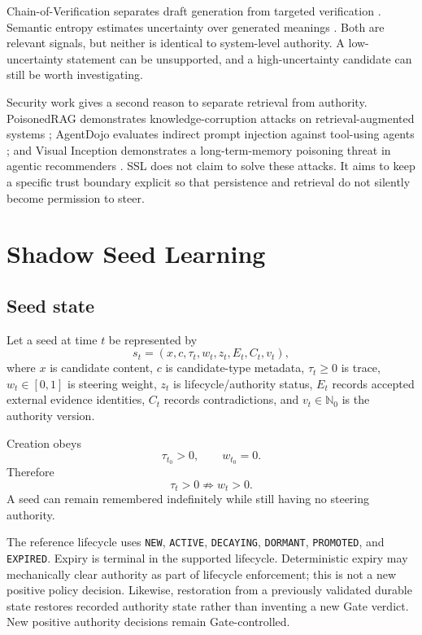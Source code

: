 \documentclass[11pt]{article}
\newcommand{\code}[1]{\texttt{#1}}
\begin{document}
Chain-of-Verification separates draft generation from targeted verification \citep{dhuliawala2024cove}. Semantic entropy estimates uncertainty over generated meanings \citep{farquhar2024semanticentropy}. Both are relevant signals, but neither is identical to system-level authority. A low-uncertainty statement can be unsupported, and a high-uncertainty candidate can still be worth investigating.

Security work gives a second reason to separate retrieval from authority. PoisonedRAG demonstrates knowledge-corruption attacks on retrieval-augmented systems \citep{zou2025poisonedrag}; AgentDojo evaluates indirect prompt injection against tool-using agents \citep{debenedetti2024agentdojo}; and Visual Inception demonstrates a long-term-memory poisoning threat in agentic recommenders \citep{qian2026visual}. SSL does not claim to solve these attacks. It aims to keep a specific trust boundary explicit so that persistence and retrieval do not silently become permission to steer.

\section{Shadow Seed Learning}
\label{sec:method}

\subsection{Seed state}

Let a seed at time $t$ be represented by
\begin{equation}
  s_t = (x,c,\tau_t,w_t,z_t,E_t,C_t,v_t),
\end{equation}
where $x$ is candidate content, $c$ is candidate-type metadata, $\tau_t \geq 0$ is trace, $w_t\in[0,1]$ is steering weight, $z_t$ is lifecycle/authority status, $E_t$ records accepted external evidence identities, $C_t$ records contradictions, and $v_t\in\mathbb{N}_0$ is the authority version.

Creation obeys
\begin{equation}
  \tau_{t_0}>0, \qquad w_{t_0}=0.
\end{equation}
Therefore
\begin{equation}
  \tau_t>0 \not\Rightarrow w_t>0.
\end{equation}
A seed can remain remembered indefinitely while still having no steering authority.

The reference lifecycle uses \code{NEW}, \code{ACTIVE}, \code{DECAYING}, \code{DORMANT}, \code{PROMOTED}, and \code{EXPIRED}. Expiry is terminal in the supported lifecycle. Deterministic expiry may mechanically clear authority as part of lifecycle enforcement; this is not a new positive policy decision. Likewise, restoration from a previously validated durable state restores recorded authority state rather than inventing a new Gate verdict. New positive authority decisions remain Gate-controlled.
\end{document}
